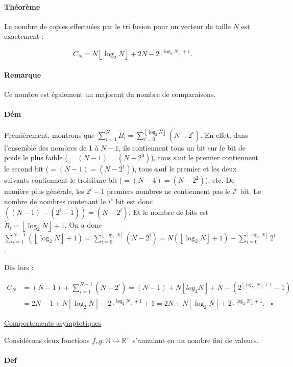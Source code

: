 \documentclass{article}
\newcommand{\floor}[1]{{\left\lfloor#1\right\rfloor}}
\begin{document}
			\paragraph{Théorème} Le nombre de copies effectuées par le tri fusion pour un vecteur de taille $N$ est exactement :

			\[C_N = N\floor{\log_2 N} + 2N - 2^{\floor{\log_2 N} + 1}.\]

			\paragraph{Remarque} Ce nombre est également un majorant du nombre de comparaisons.

			\paragraph{Dém} Premièrement, montrons que $\sum_{i=1}^N\widetilde B_i = \sum_{i=0}^{\floor{\log_2 N}}(N-2^i)$. En effet, dans l'ensemble des nombres de 1 à $N-1$,
			ils contiennent tous un bit sur le bit de poids le plus faible ($= (N-1) = (N-2^0)$), tous sauf le premier contiennent le second bit ($= (N-1) = (N-2^1)$), tous sauf le premier
			et les deux suivants contiennent le troisième bit ($= (N-4) = (N-2^2)$), etc. De manière plus générale, les $2^i-1$ premiers nombres ne contiennent pas le $i^e$ bit.
			Le nombre de nombres contenant le $i^e$ bit est donc $((N-1)-(2^i-1)) = (N-2^i)$. Et le nombre de bits est $\widetilde B_i = \floor {\log_2 N} + 1$. On a donc
			$\sum_{i=1}^{N-1}(\floor{\log_2 N} + 1) = \sum_{i=0}^{\floor{\log_2 N}}(N-2^i) = N(\floor{\log_2 N} + 1) - \sum_{i=0}^{\floor{\log_2 N}}2^i$.

			Dès lors :

			\begin{align*}
				C_N &= (N-1) + \sum_{i=1}^{N-1}(N-2^i) = (N-1) + N\floor{log_2 N} + N - (2^{\floor{\log_2 N} + 1} - 1) \\
					&= 2N - 1 + N\floor{\log_2 N} - 2^{\floor{\log_2 N}+1} + 1 = 2N + N\floor{\log_2 N} + 2^{\floor{\log_2 N}+1}. \;\;\;\square
			\end{align*}

			\underline{Comportements asymptotiques}

			Considérons deux fonctions $f, g : \mathbb N \to \mathbb R^+$ s'annulant en un nombre fini de valeurs.

			\paragraph{Def}
\end{document}
